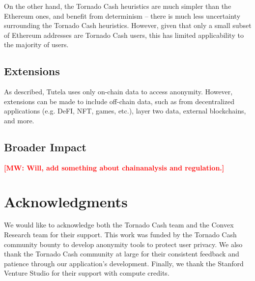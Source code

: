 \documentclass[11pt,a4paper]{article}
\newcommand{\mike}[1]{\textcolor{red}{\bf [MW: #1]}}
\begin{document}
On the other hand, the Tornado Cash heuristics are much simpler than the Ethereum ones, and benefit from  determinism -- there is much less uncertainty surrounding the Tornado Cash heuristics.
However, given that only a small subset of Ethereum addresses are Tornado Cash users, this has limited applicability to the majority of users.

\subsection{Extensions}

As described, Tutela uses only on-chain data to access anonymity. However, extensions can be made to include off-chain data, such as from decentralized applications (e.g. DeFI, NFT, games, etc.), layer two data, external blockchains, and more.

\subsection{Broader Impact}

\mike{Will, add something about chainanalysis and regulation.}

\section*{Acknowledgments}
We would like to acknowledge both the Tornado Cash team and the Convex Research team for their support. This work was funded by the Tornado Cash community bounty to develop anonymity tools to protect user privacy. We also thank the Tornado Cash community at large for their consistent feedback and patience through our application's development. Finally, we thank the Stanford Venture Studio for their support with compute credits.



\end{document}
